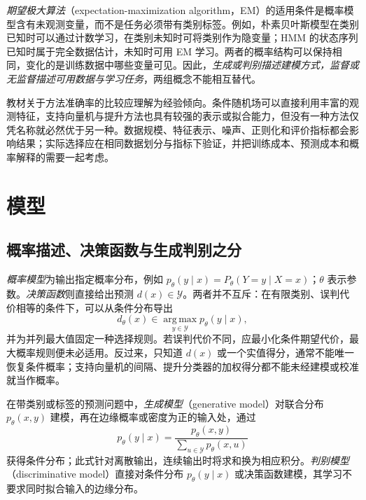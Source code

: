 \emph{期望极大算法}（expectation-maximization algorithm，EM）的适用条件是概率模型含有未观测变量，而不是任务必须带有类别标签。例如，朴素贝叶斯模型在类别已知时可以通过计数学习，在类别未知时可将类别作为隐变量；HMM 的状态序列已知时属于完全数据估计，未知时可用 EM 学习。两者的概率结构可以保持相同，变化的是训练数据中哪些变量可见。因此，\emph{生成或判别描述建模方式，监督或无监督描述可用数据与学习任务}，两组概念不能相互替代。

教材关于方法准确率的比较应理解为经验倾向。条件随机场可以直接利用丰富的观测特征，支持向量机与提升方法也具有较强的表示或拟合能力，但没有一种方法仅凭名称就必然优于另一种。数据规模、特征表示、噪声、正则化和评价指标都会影响结果；实际选择应在相同数据划分与指标下验证，并把训练成本、预测成本和概率解释的需要一起考虑。

\section{模型}
\label{sec:lh-summary-models}

\subsection{概率描述、决策函数与生成判别之分}
\label{subsec:lh-summary-model-types}

\emph{概率模型}为输出指定概率分布，例如 $p_\theta(y\mid x)=P_\theta(Y=y\mid X=x)$；$\theta$ 表示参数。\emph{决策函数}则直接给出预测 $d(x)\in\mathcal Y$。两者并不互斥：在有限类别、误判代价相等的条件下，可以从条件分布导出
\begin{equation}
d_\theta(x)\in\operatorname*{arg\,max}_{y\in\mathcal Y}p_\theta(y\mid x),
\label{eq:lh-summary-bayes-decision}
\end{equation}
并为并列最大值固定一种选择规则。若误判代价不同，应最小化条件期望代价，最大概率规则便未必适用。反过来，只知道 $d(x)$ 或一个实值得分，通常不能唯一恢复条件概率；支持向量机的间隔、提升分类器的加权得分都不能未经建模或校准就当作概率。

\begin{definition}[生成模型与判别模型]
\label{def:lh-summary-generative-discriminative}
在带类别或标签的预测问题中，\emph{生成模型}（generative model）对联合分布 $p_\theta(x,y)$ 建模，再在边缘概率或密度为正的输入处，通过
\begin{equation}
p_\theta(y\mid x)=\frac{p_\theta(x,y)}{\sum_{u\in\mathcal Y}p_\theta(x,u)}
\label{eq:lh-summary-generative-conditional}
\end{equation}
获得条件分布；此式针对离散输出，连续输出时将求和换为相应积分。\emph{判别模型}（discriminative model）直接对条件分布 $p_\theta(y\mid x)$ 或决策函数建模，其学习不要求同时拟合输入的边缘分布。
\end{definition}

